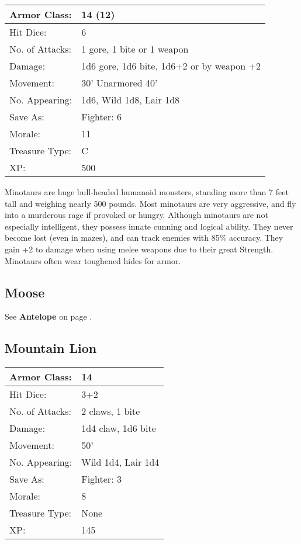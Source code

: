 \documentclass[a4paper,twoside,openany,10pt]{book}
\begin{document}
\begin{multicols}{2}
\begin{flushleft}
	\begin{tabularx}{0.50\textwidth}{@{}lX@{}}
Armor Class: & 14 (12) \\\hline
Hit Dice: & 6 \\\hline
No. of Attacks: & 1 gore, 1 bite or 1 weapon \\\hline
Damage: & 1d6 gore, 1d6 bite, 1d6+2 or by weapon +2 \\\hline
Movement: & 30' Unarmored 40' \\\hline
No. Appearing: & 1d6, Wild 1d8, Lair 1d8 \\\hline
Save As: & Fighter: 6 \\\hline
Morale: & 11 \\\hline
Treasure Type: & C \\\hline
XP: & 500 \\\hline
\end{tabularx}\medskip
\end{flushleft}

Minotaurs are huge bull-headed humanoid monsters, standing more than 7 feet tall and weighing nearly 500 pounds. Most minotaurs are very aggressive, and fly into a murderous rage if provoked or hungry. Although minotaurs are not especially intelligent, they possess innate cunning and logical ability. They never become lost (even in mazes), and can track enemies with 85\% accuracy. They gain +2 to damage when using melee weapons due to their great Strength. Minotaurs often wear toughened hides for armor. 

\subsection*{Moose}\label{moose}

See \textbf{Antelope} on page \hyperlink{antelope}{\pageref{antelope}}.

\subsection*{Mountain Lion}\label{mountain-lion}

\begin{tabularx}{0.50\textwidth}{@{}lX@{}}
Armor Class: & 14 \\\hline
Hit Dice: & 3+2 \\\hline
No. of Attacks: & 2 claws, 1 bite \\\hline
Damage: & 1d4 claw, 1d6 bite \\\hline
Movement: & 50' \\\hline
No. Appearing: & Wild 1d4, Lair 1d4 \\\hline
Save As: & Fighter: 3 \\\hline
Morale: & 8 \\\hline
Treasure Type: & None \\\hline
XP: & 145 \\\hline
\end{tabularx}\medskip


\end{multicols}
\end{document}

